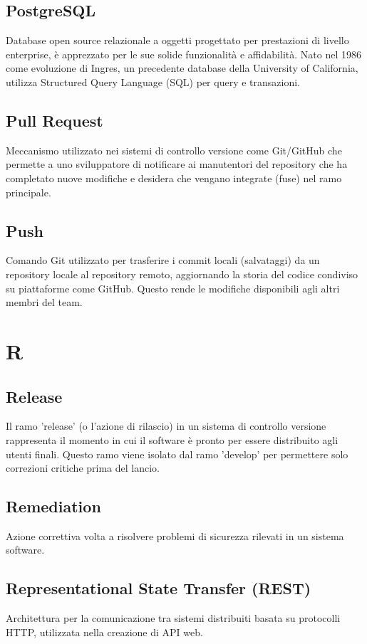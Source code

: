 \documentclass[10pt, letterpaper]{article}
\begin{document}
\subsection*{PostgreSQL}
Database open source relazionale a oggetti progettato per prestazioni di livello enterprise, è apprezzato per le sue solide funzionalità e affidabilità.
Nato nel 1986 come evoluzione di Ingres, un precedente database della University of California, utilizza Structured Query Language (SQL) per query e transazioni.

\subsection*{Pull Request}
Meccanismo utilizzato nei sistemi di controllo versione come Git/GitHub che permette a uno sviluppatore di notificare ai manutentori del repository che ha
completato nuove modifiche e desidera che vengano integrate (fuse) nel ramo principale.

\subsection*{Push}
Comando Git utilizzato per trasferire i commit locali (salvataggi) da un repository locale al repository remoto, aggiornando la storia del codice condiviso
su piattaforme come GitHub. Questo rende le modifiche disponibili agli altri membri del team.

\section{R}

\subsection*{Release}
Il ramo 'release' (o l'azione di rilascio) in un sistema di controllo versione rappresenta il momento in cui il software è pronto per essere distribuito
agli utenti finali. Questo ramo viene isolato dal ramo 'develop' per permettere solo correzioni critiche prima del lancio.

\subsection*{Remediation}
Azione correttiva volta a risolvere problemi di sicurezza rilevati in un sistema software.

\subsection*{Representational State Transfer (REST)}
Architettura per la comunicazione tra sistemi distribuiti basata su protocolli HTTP, utilizzata nella creazione di API web.
\end{document}
